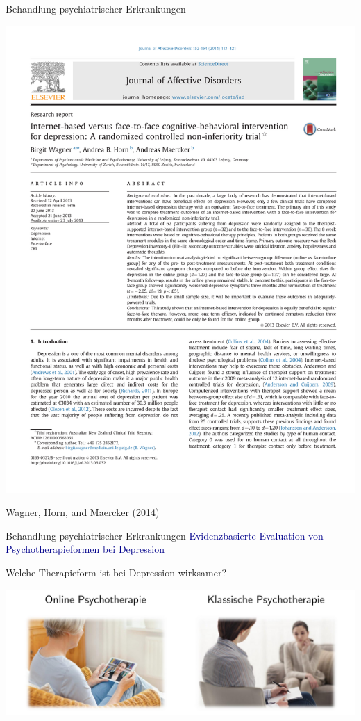 \documentclass[
  8pt,
  ignorenonframetext,
]{beamer}
\begin{document}
\begin{frame}{Behandlung psychiatrischer Erkrankungen}
\protect\hypertarget{behandlung-psychiatrischer-erkrankungen}{}
\begin{center}\includegraphics[width=0.6\linewidth]{2_Abbildungen/pfm_2_wagner_abstract} \end{center}

\flushright
\footnotesize

Wagner, Horn, and Maercker (2014)
\end{frame}

\begin{frame}{Behandlung psychiatrischer Erkrankungen}
\protect\hypertarget{behandlung-psychiatrischer-erkrankungen-1}{}
\textcolor{darkblue}{Evidenzbasierte Evaluation von Psychotherapieformen bei Depression}

\normalsize

Welche Therapieform ist bei Depression wirksamer?

\begin{center}\includegraphics[width=1.1\linewidth]{2_Abbildungen/pfm_2_klinische_forschung} \end{center}
\end{frame}
\end{document}

